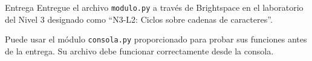 \documentclass{ip-lab}
\begin{document}
\begin{sectionbox}{Entrega}
Entregue el archivo \texttt{modulo.py} a través de Brightspace en el laboratorio del Nivel 3 designado como ``N3-L2: Ciclos sobre cadenas de caracteres''.

Puede usar el módulo \texttt{consola.py} proporcionado para probar sus funciones antes de la entrega. Su archivo debe funcionar correctamente desde la consola.
\end{sectionbox}
\end{document}
